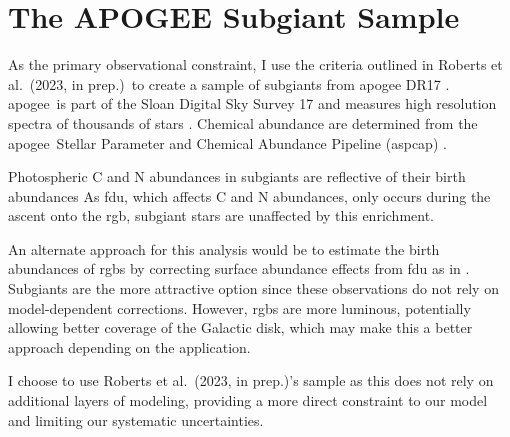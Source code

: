 \documentclass[12pt,oneside,letterpaper]{report}
\newcommand{\apogee}{\gls{apogee}}
\newcommand{\citetjack}{Roberts et al.~(2023, in prep.)}
\begin{document}
\section{The APOGEE Subgiant Sample}\label{sec:jack}

As the primary observational constraint, I use the criteria outlined in \citetjack~to create a sample of \gls{subgiant}s from \apogee{} DR17 \citep{apogee17}. \apogee\ is part of the Sloan Digital Sky Survey 17 and measures high resolution spectra of thousands of stars \cite{sdss17}. Chemical abundance are determined from the \apogee\ Stellar Parameter and Chemical Abundance Pipeline ({\sc aspcap}) \citep{aspcap}.  


Photospheric C and N abundances in \gls{subgiant}s are reflective of their birth abundances \citep{gilroy89, korn+07, lind+08, souto+18, souto19} As \gls{fdu}, which affects C and N abundances, only occurs during the ascent onto the \gls{rgb}, \gls{subgiant} stars are unaffected by this enrichment. 

An alternate approach for this analysis would be to estimate the birth abundances of \gls{rgb}s by correcting surface abundance effects from \gls{fdu} as in \cite{vincenzo+21}. Subgiants are the more attractive option since these observations do not rely on model-dependent corrections. However, \gls{rgb}s are more luminous, potentially allowing better coverage of the Galactic disk, which may make this a better approach depending on the application.


I choose to use \citetjack's sample as this does not rely on additional layers of modeling, providing a more direct constraint to our model and limiting our systematic uncertainties.
\end{document}
